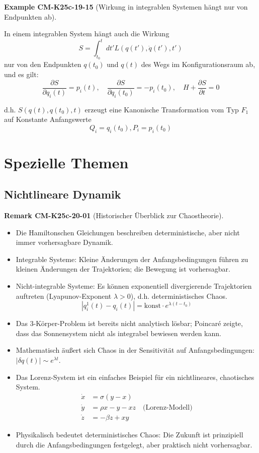 \documentclass[10pt, letterpaper]{article}
\newcommand{\CustomHeading}[3]{%
  \par\medskip\noindent%
  \textbf{#1 #2} \textnormal{(#3)}.\enskip%
}
\newenvironment{REM}[2]{\CustomHeading{Remark}{#1}{#2}}{}
\newenvironment{EXA}[2]{\CustomHeading{Example}{#1}{#2}}{}
\begin{document}
\begin{EXA}{CM-K25c-19-15}{Wirkung in integrablen Systemen hängt nur von Endpunkten ab}
In einem integrablen System hängt auch die Wirkung
\[
S = \int_{t_0}^t dt' L(q(t'), \dot{q}(t'), t')
\]
nur von den Endpunkten $q(t_0)$ und $q(t)$ des Wegs im Konfigurationsraum ab, und es gilt:
\[
\frac{\partial S}{\partial q_i(t)} = p_i(t), \quad \frac{\partial S}{\partial q_i(t_0)} = -p_i(t_0), \quad H + \frac{\partial S}{\partial t} = 0
\]

\noindent
d.h. $S(q(t), q(t_0), t)$ erzeugt eine Kanonische Transformation vom Typ $F_1$ auf Konstante Anfangswerte 
$$Q_i = q_i(t_0), P_i = p_i(t_0)$$
\end{EXA}

\section{Spezielle Themen}

\subsection{Nichtlineare Dynamik}

\begin{REM}{CM-K25c-20-01}{Historischer Überblick zur Chaostheorie}
\begin{itemize}
  \item Die Hamiltonschen Gleichungen beschreiben deterministische, aber nicht immer vorhersagbare Dynamik.
  \item Integrable Systeme: Kleine Änderungen der Anfangsbedingungen führen zu kleinen Änderungen der Trajektorien; die Bewegung ist vorhersagbar.
  \item Nicht-integrable Systeme: Es können exponentiell divergierende Trajektorien auftreten (Lyapunov-Exponent $\lambda > 0$), d.h. deterministisches Chaos.
  \[|q^1_i(t) - q_i(t)| = \text{konst} \cdot e^{\lambda(t-t_0)}\]
  \item Das 3-Körper-Problem ist bereits nicht analytisch lösbar; Poincaré zeigte, dass das Sonnensystem nicht als integrabel bewiesen werden kann.
  \item Mathematisch äußert sich Chaos in der Sensitivität auf Anfangsbedingungen: $|\delta q(t)| \sim e^{\lambda t}$.
  \item Das Lorenz-System ist ein einfaches Beispiel für ein nichtlineares, chaotisches System.
  \begin{align*}
\dot{x} &= \sigma(y-x)\\
\dot{y} &= \rho x - y - xz \quad \text{(Lorenz-Modell)}\\
\dot{z} &= -\beta z + xy
\end{align*}
  \item Physikalisch bedeutet deterministisches Chaos: Die Zukunft ist prinzipiell durch die Anfangsbedingungen festgelegt, aber praktisch nicht vorhersagbar.
\end{itemize}
\end{REM}
\end{document}
